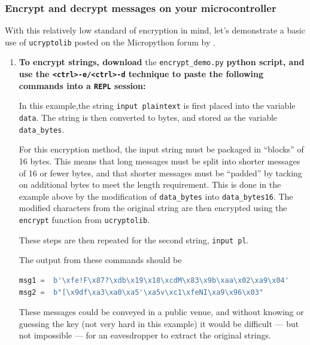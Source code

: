\subsubsection{\howto Encrypt and decrypt messages on your microcontroller}
With this relatively low standard of encryption in mind, let's demonstrate a basic use of \lstinline{ucryptolib} posted on the Micropython forum by .
\begin{enumerate}
	\item \textbf{To encrypt strings, download} the \lstinline{encrypt_demo.py} \textbf{python script, and use the \lstinline{<ctrl>-e/<ctrl>-d} technique to paste the following commands into a \texttt{REPL} session:}


	In this example,the string \texttt{input plaintext} is first placed into the variable \lstinline{data}.
	The string is then converted to bytes, and stored as the variable \lstinline{data_bytes}.

	\smallskip
	For this encryption method, the input string must be packaged in ``blocks'' of 16 bytes.
	This means that long messages must be split into shorter messages of 16 or fewer bytes, and that shorter messages must be ``padded'' by tacking on additional bytes to meet the length requirement.
	This is done in the example above by the modification of \lstinline{data_bytes} into \lstinline{data_bytes16}.
	The modified characters from the original string are then encrypted using the \lstinline{encrypt} function from \lstinline{ucryptolib}.
	
	\smallskip
	These steps are then repeated for the second string, \texttt{input pl}.

	The output from these commands should be
\begin{lstlisting}[language=Python]
msg1 =  b'\xfe!F\x87?\xdb\x19\x18\xcdM\x83\x9b\xaa\x02\xa9\x04'
msg2 =  b"[\x9df\xa3\xa0\xa5'\xa5v\xc1\xfeNI\xa9\x96\x03"
\end{lstlisting}
	These messages could be conveyed in a public venue, and without knowing or guessing the key (not very hard in this example) it would be difficult --- but not impossible --- for an eavesdropper to extract the original strings.


\end{enumerate}
